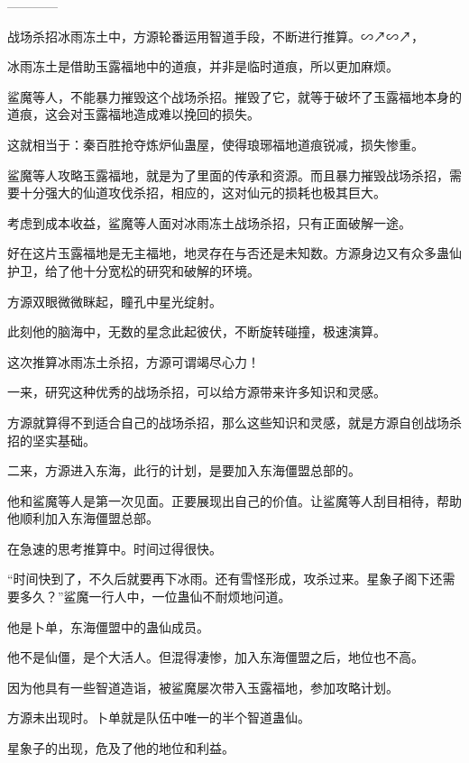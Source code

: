 
\begin{this_body}

------------

战场杀招冰雨冻土中，方源轮番运用智道手段，不断进行推算。∽↗∽↗，

冰雨冻土是借助玉露福地中的道痕，并非是临时道痕，所以更加麻烦。

鲨魔等人，不能暴力摧毁这个战场杀招。摧毁了它，就等于破坏了玉露福地本身的道痕，这会对玉露福地造成难以挽回的损失。

这就相当于：秦百胜抢夺炼炉仙蛊屋，使得琅琊福地道痕锐减，损失惨重。

鲨魔等人攻略玉露福地，就是为了里面的传承和资源。而且暴力摧毁战场杀招，需要十分强大的仙道攻伐杀招，相应的，这对仙元的损耗也极其巨大。

考虑到成本收益，鲨魔等人面对冰雨冻土战场杀招，只有正面破解一途。

好在这片玉露福地是无主福地，地灵存在与否还是未知数。方源身边又有众多蛊仙护卫，给了他十分宽松的研究和破解的环境。

方源双眼微微眯起，瞳孔中星光绽射。

此刻他的脑海中，无数的星念此起彼伏，不断旋转碰撞，极速演算。

这次推算冰雨冻土杀招，方源可谓竭尽心力！

一来，研究这种优秀的战场杀招，可以给方源带来许多知识和灵感。

方源就算得不到适合自己的战场杀招，那么这些知识和灵感，就是方源自创战场杀招的坚实基础。

二来，方源进入东海，此行的计划，是要加入东海僵盟总部的。

他和鲨魔等人是第一次见面。正要展现出自己的价值。让鲨魔等人刮目相待，帮助他顺利加入东海僵盟总部。

在急速的思考推算中。时间过得很快。

“时间快到了，不久后就要再下冰雨。还有雪怪形成，攻杀过来。星象子阁下还需要多久？”鲨魔一行人中，一位蛊仙不耐烦地问道。

他是卜单，东海僵盟中的蛊仙成员。

他不是仙僵，是个大活人。但混得凄惨，加入东海僵盟之后，地位也不高。

因为他具有一些智道造诣，被鲨魔屡次带入玉露福地，参加攻略计划。

方源未出现时。卜单就是队伍中唯一的半个智道蛊仙。

星象子的出现，危及了他的地位和利益。


\end{this_body}

